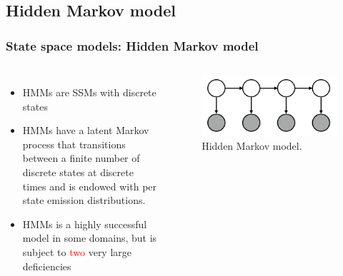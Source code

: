 \documentclass[aspectratio=169]{beamer}
\begin{document}
\subsection{Hidden Markov model}
\begin{frame}
    \frametitle{State space models: Hidden Markov model}


    \begin{columns}[c] 


        \begin{itemize}
            \item HMMs are SSMs with discrete states
            \item HMMs have a latent Markov process that transitions between a finite number of discrete states at discrete times and is endowed with per state emission distributions.
            \item HMMs is a highly successful model in some domains, but is subject to \textcolor{red}{two} very large deficiencies
        \end{itemize}


        \begin{figure}
            \includegraphics[width=1.0\linewidth]{hmm.png}
            \caption{Hidden Markov model.}
        \end{figure}

    \end{columns}

\end{frame}

\end{document}
